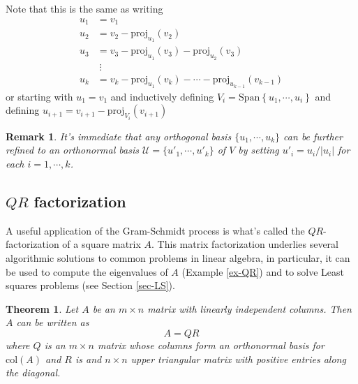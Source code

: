 \documentclass[12pt]{article}
\numberwithin{equation}{subsection}
\numberwithin{figure}{subsection}
\newtheorem{thm}[subsection]{Theorem}
\theoremstyle{note}
\newtheorem{remark}[subsection]{Remark}
\newcommand\Span[1]{\mathrm{Span}\left\{#1\right\}}
\newcommand\col[1]{\mathrm{col}(#1)}
\newcommand\proj[2]{\mathrm{proj}_{#1}(#2)}
\begin{document}
Note that this is the same as writing
\begin{align}
	u_1 &= v_1 \nonumber \\
	u_2 &= v_2- \proj{u_1}{v_2} \nonumber\\
	u_3 &= v_3 -\proj{u_1}{v_3}-\proj{u_2}{v_3} \nonumber \\
	& \;\vdots \nonumber\\
	u_k &= v_k - \proj{u_1}{v_k} - \cdots -\proj{u_{k-1}}{v_{k-1}}
\end{align}
or starting with $u_1=v_1$ and inductively defining $V_i=\Span{u_1,\cdots,u_i}$ and defining $u_{i+1}=v_{i+1}-\proj{V_i}{v_{i+1}}$

 \begin{remark} It's immediate that any orthogonal basis $\{u_1,\cdots,u_k\}$ can be further refined to an ortho\textit{normal} basis $\mathcal{U}=\{u'_1,\cdots,u'_k\}$ of $V$ by setting $u'_i=u_i/|u_i|$ for each $i=1,\cdots,k$. 
 \end{remark}

\subsection{$QR$ factorization}

A useful application of the Gram-Schmidt process is what's called the $QR$-factorization of a square matrix $A$. This matrix factorization underlies several algorithmic solutions to common problems in linear algebra, in particular, it can be used to compute the eigenvalues of $A$ (Example \ref{ex-QR}) and to solve Least squares problems (see Section \ref{sec-LS}).
\begin{thm} \label{thm-QR}Let $A$ be an $m\times n$ matrix with linearly independent columns. Then $A$ can be written as \begin{equation} A=QR\end{equation} where $Q$ is an $m\times n$ matrix whose columns form an orthonormal basis for $\col{A}$ and $R$ is and $n\times n$ upper triangular matrix with positive entries along the diagonal.\end{thm}
\end{document}
